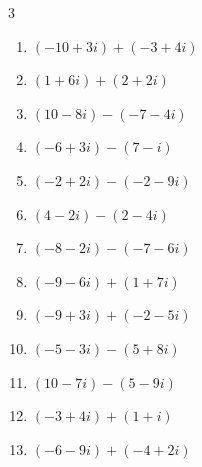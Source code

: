 \begin{multicols}{3}
\begin{enumerate}
        \phantom{$\displaystyle =13-3i$}

  \item $\displaystyle (-10+3i) + (-3+4i)$

        \phantom{$\displaystyle =-13+7i$}

  \item $\displaystyle (1+6i) + (2+2i)$

        \phantom{$\displaystyle =3+8i$}

  \item $\displaystyle (10-8i) - (-7-4i)$

        \phantom{$\displaystyle =17-4i$}

  \item $\displaystyle (-6+3i) - (7-i)$

        \phantom{$\displaystyle =-13+4i$}

  \item $\displaystyle (-2+2i) - (-2-9i)$

        \phantom{$\displaystyle =11i$}

  \item $\displaystyle (4-2i) - (2-4i)$

        \phantom{$\displaystyle =2+2i$}

  \item $\displaystyle (-8-2i) - (-7-6i)$

        \phantom{$\displaystyle =-1+4i$}

  \item $\displaystyle (-9-6i) + (1+7i)$

        \phantom{$\displaystyle =-8+i$}

  \item $\displaystyle (-9+3i) + (-2-5i)$

        \phantom{$\displaystyle =-11-2i$}

\columnbreak %

  \item $\displaystyle (-5-3i) - (5+8i)$

        \phantom{$\displaystyle =-10-11i$}

  \item $\displaystyle (10-7i) - (5-9i)$

        \phantom{$\displaystyle =5+2i$}

  \item $\displaystyle (-3+4i) + (1+i)$

        \phantom{$\displaystyle =-2+5i$}

  \item $\displaystyle (-6-9i) + (-4+2i)$


\end{enumerate}
\end{multicols}
